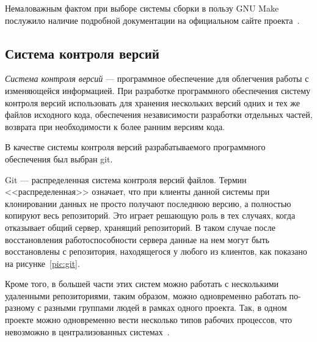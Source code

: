 Немаловажным фактом при выборе системы сборки в пользу GNU Make 
послужило наличие подробной документации на официальном сайте 
проекта~\cite{doc_make}.

\subsection{Система контроля версий}

\textit{Система контроля версий} --- программное обеспечение для облегчения
работы с изменяющейся информацией.
При разработке программного обеспечения систему контроля версий использовать
для хранения нескольких версий одних и тех же файлов исходного кода,
обеспечения независимости разработки отдельных частей,
возврата при необходимости к более ранним версиям кода.

В качестве системы контроля версий разрабатываемого программного обеспечения
был выбран git.

Git --- распределенная система контроля версий файлов.
Термин <<распределенная>> означает, что при клиенты данной системы при
клонировании данных не просто получают последнюю версию,
а полностью копируют весь репозиторий.
Это играет решающую роль в тех случаях, когда отказывает 
общий сервер, хранящий репозиторий. 
В таком случае после восстановления работоспособности сервера данные
на нем могут быть восстановлены с репозитория,
находящегося у любого из клиентов, как показано на рисунке~\ref{pic:git}.

Кроме того, в большей части этих систем можно работать с несколькими
удаленными репозиториями, таким образом, можно одновременно работать по-разному
с разными группами людей в рамках одного проекта.
Так, в одном проекте можно одновременно вести несколько типов рабочих процессов,
что невозможно в централизованных системах~\cite{doc_scm}.

